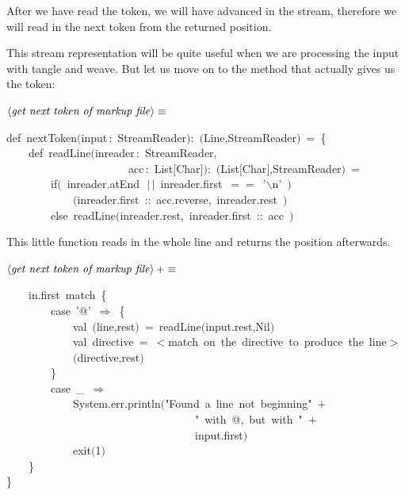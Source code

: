 \documentclass[a4paper,12pt]{article}
\begin{document}
After we have read the token, we will have advanced in the stream, therefore
we will read in the next token from the returned position.

This stream representation will be quite useful when we are processing
the input with tangle and weave. But let us move on to the method that
actually gives us the token:

$\left<\mbox{\emph{get next token of markup file}}\right>\equiv$
\begin{program}{\vem def}~nextToken$($input\,{\rm :}~StreamReader$)${\rm :}~$($Line,StreamReader$)$~=~{\small\{}
\\~~~~{\vem def}~readLine$($inreader\,{\rm :}~StreamReader,
\\~~~~~~~~~~~~~~~~~~~~~~acc\,{\rm :}~List$[$Char$]$$)${\rm :}~$($List$[$Char$]$,StreamReader$)$~=
\\~~~~~~~~{\vem if}$($~inreader.atEnd~$\,|$$\,|$~inreader.first~$==$~'$\backslash$n'~$)$
\\~~~~~~~~~~~~$($inreader.first~{\rm :}{\rm :}~acc.reverse,~inreader.rest~$)$
\\~~~~~~~~{\vem else}~readLine$($inreader.rest,~inreader.first~{\rm :}{\rm :}~acc~$)$
\\[0.5em]\end{program}



This little function reads in the whole line and returns the position
afterwards.

$\left<\mbox{\emph{get next token of markup file}}\right>+\equiv$
\begin{program}~~~~in.first~{\vem match}~{\small\{}
\\~~~~~~~~{\vem case}~'@'~$\Rightarrow$~{\small\{}
\\~~~~~~~~~~~~{\vem val}~$($line,rest$)$~=~readLine$($input.rest,Nil$)$
\\~~~~~~~~~~~~{\vem val}~directive~=~$<${\vem match}~on~the~directive~to~produce~the~line$>$
\\~~~~~~~~~~~~$($directive,rest$)$
\\~~~~~~~~{\small\}}
\\~~~~~~~~{\vem case}~\_~$\Rightarrow$
\\~~~~~~~~~~~~System.err.println$($"Found~a~line~not~beginning"~$+$
\\~~~~~~~~~~~~~~~~~~~~~~~~~~~~~~~~~~"~{\vem with}~@,~but~{\vem with}~"~$+$
\\~~~~~~~~~~~~~~~~~~~~~~~~~~~~~~~~~~input.first$)$
\\~~~~~~~~~~~~exit$($1$)$
\\~~~~{\small\}}
\\{\small\}}
\\[0.5em]\end{program}
\end{document}

